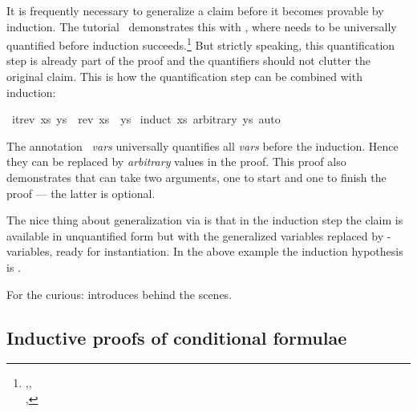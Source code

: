\begin{isabellebody}
\begin{isamarkuptext}
It is frequently necessary to generalize a claim before it becomes
provable by induction. The tutorial~\cite{LNCS2283} demonstrates this
with , where 
needs to be universally quantified before induction succeeds.\footnote{,\quad {},\\ ,\quad {}} But
strictly speaking, this quantification step is already part of the
proof and the quantifiers should not clutter the original claim. This
is how the quantification step can be combined with induction:%
\end{isamarkuptext}%
\isamarkuptrue%
\isamarkupfalse%
\ {\isachardoublequoteopen}itrev\ xs\ ys\ {\isacharequal}\ rev\ xs\ {\isacharat}\ ys{\isachardoublequoteclose}\isanewline
%
\isadelimproof
%
\endisadelimproof
%
\isatagproof
{}\isamarkupfalse%
\ {\isacharparenleft}induct\ xs\ arbitrary{\isacharcolon}\ ys{\isacharparenright}\ auto%
\endisatagproof
{\isafoldproof}%
%
\isadelimproof
%
\endisadelimproof
%
\begin{isamarkuptext}%
\noindent The annotation ~\emph{vars}
universally quantifies all \emph{vars} before the induction.  Hence
they can be replaced by \emph{arbitrary} values in the proof.
This proof also demonstrates that  can take two arguments,
one to start and one to finish the proof --- the latter is optional.

The nice thing about generalization via  is that in
the induction step the claim is available in unquantified form but
with the generalized variables replaced by \isa{{\isacharquery}}-variables, ready
for instantiation. In the above example the
induction hypothesis is .

For the curious:  introduces \isa{{\isasymAnd}}
behind the scenes.

\subsection{Inductive proofs of conditional formulae}
\label{sec:full-Ind}


\end{isamarkuptext}
\end{isabellebody}
